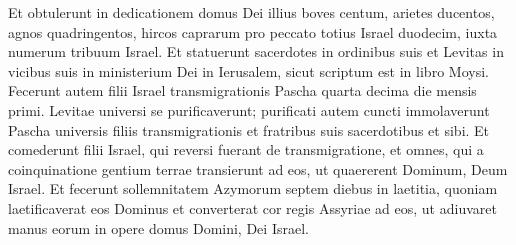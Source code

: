 \begin{biblechapter}
\verse Et obtulerunt in dedicationem domus Dei illius boves centum, arietes ducentos, agnos quadringentos, hircos caprarum pro peccato totius Israel duodecim, iuxta numerum tribuum Israel. 
\verse Et statuerunt sacerdotes in ordinibus suis et Levitas in vicibus suis in ministerium Dei in Ierusalem, sicut scriptum est in libro Moysi. 
\verse Fecerunt autem filii Israel transmigrationis Pascha quarta decima die mensis primi. 
\verse Levitae universi se purificaverunt; purificati autem cuncti immolaverunt Pascha universis filiis transmigrationis et fratribus suis sacerdotibus et sibi. 
\verse Et comederunt filii Israel, qui reversi fuerant de transmigratione, et omnes, qui a coinquinatione gentium terrae transierunt ad eos, ut quaererent Dominum, Deum Israel. 
\verse Et fecerunt sollemnitatem Azymorum septem diebus in laetitia, quoniam laetificaverat eos Dominus et converterat cor regis Assyriae ad eos, ut adiuvaret manus eorum in opere domus Domini, Dei Israel. 
\end{biblechapter}

